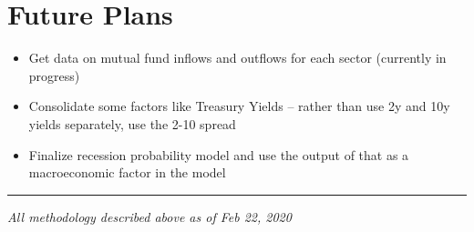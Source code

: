 \documentclass[]{article}
\providecommand{\tightlist}{%
  \setlength{\itemsep}{2pt}\setlength{\parskip}{0pt}}
\begin{document}
\hypertarget{future-plans}{%
\section{Future Plans}\label{future-plans}}

\begin{itemize}
\tightlist
\item
  Get data on mutual fund inflows and outflows for each sector
  (currently in progress)
\item
  Consolidate some factors like Treasury Yields -- rather than use 2y
  and 10y yields separately, use the 2-10 spread
\item
  Finalize recession probability model and use the output of that as a
  macroeconomic factor in the model
\end{itemize}

\begin{center}
\noindent\rule{8cm}{0.4pt}

\emph{All methodology described above as of Feb 22, 2020}
\end{center}
\end{document}
